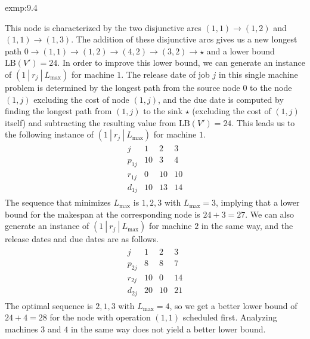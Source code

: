 \begin{exmp}{exmp:9.4}
\begin{center}
    \end{center}
    This node is characterized by the two disjunctive arcs 
    $(1, 1) \to (1, 2)$ and $(1, 1) \to (1, 3)$. The addition of these 
    disjunctive arcs gives us a new longest path $0 \to (1, 1) \to (1, 2) 
    \to (4, 2) \to (3, 2) \to \star$ and a lower bound $\text{LB}(V') = 24$.
    In order to improve this lower bound, we can generate an instance of 
    $(1~|~r_j~|~L_{\max})$ for machine $1$. The release date of job $j$ 
    in this single machine problem is determined by the longest 
    path from the source node $0$ to the node $(1, j)$ excluding 
    the cost of node $(1, j)$, and the due date is computed by finding the 
    longest path from $(1, j)$ to the sink $\star$ (excluding the cost 
    of $(1, j)$ itself) and subtracting the resulting value from 
    $\text{LB}(V') = 24$. This leads us to the following instance 
    of $(1~|~r_j~|~L_{\max})$ for machine $1$. 
    \begin{align*}
        \begin{array}{c|ccc}
            j & 1 & 2 & 3 \\ \hline 
            p_{1j} & 10 & 3 & 4 \\ 
            r_{1j} & 0 & 10 & 10 \\ 
            d_{1j} & 10 & 13 & 14 
        \end{array}
    \end{align*}
    The sequence that minimizes $L_{\max}$ is $1, 2, 3$ with $L_{\max} = 3$, 
    implying that a lower bound for the makespan at the corresponding node 
    is $24 + 3 = 27$. We can also generate an instance of $(1~|~r_j~|~L_{\max})$ 
    for machine $2$ in the same way, and the release dates and due dates 
    are as follows. 
    \begin{align*}
        \begin{array}{c|ccc}
            j & 1 & 2 & 3 \\ \hline 
            p_{2j} & 8 & 8 & 7 \\ 
            r_{2j} & 10 & 0 & 14 \\ 
            d_{2j} & 20 & 10 & 21 
        \end{array}
    \end{align*}
    The optimal sequence is $2, 1, 3$ with $L_{\max} = 4$, so we get a 
    better lower bound of $24 + 4 = 28$ for the node with operation $(1, 1)$ 
    scheduled first. Analyzing machines $3$ and $4$ in the same way does not 
    yield a better lower bound. 


\end{exmp}
